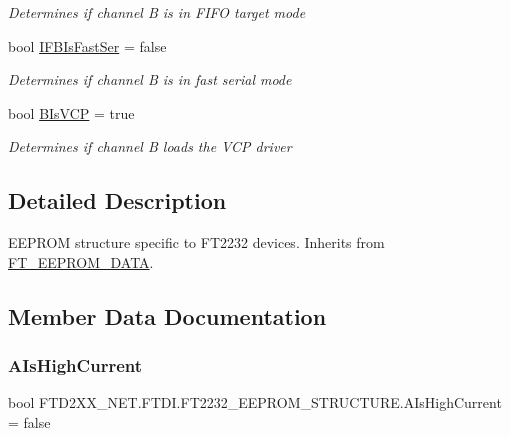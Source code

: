 \begin{DoxyCompactItemize}
\begin{DoxyCompactList}\small\item\em Determines if channel B is in F\+I\+FO target mode \end{DoxyCompactList}\item 
bool \mbox{\hyperlink{class_f_t_d2_x_x___n_e_t_1_1_f_t_d_i_1_1_f_t2232___e_e_p_r_o_m___s_t_r_u_c_t_u_r_e_a6bb7cdda276ae96eaab74710b90c5ad7}{I\+F\+B\+Is\+Fast\+Ser}} = false
\begin{DoxyCompactList}\small\item\em Determines if channel B is in fast serial mode \end{DoxyCompactList}\item 
bool \mbox{\hyperlink{class_f_t_d2_x_x___n_e_t_1_1_f_t_d_i_1_1_f_t2232___e_e_p_r_o_m___s_t_r_u_c_t_u_r_e_a4bab10e9f124f0db0df5128e3239ba21}{B\+Is\+V\+CP}} = true
\begin{DoxyCompactList}\small\item\em Determines if channel B loads the V\+CP driver \end{DoxyCompactList}\end{DoxyCompactItemize}


\subsection{Detailed Description}
E\+E\+P\+R\+OM structure specific to F\+T2232 devices. Inherits from \mbox{\hyperlink{class_f_t_d2_x_x___n_e_t_1_1_f_t_d_i_1_1_f_t___e_e_p_r_o_m___d_a_t_a}{F\+T\+\_\+\+E\+E\+P\+R\+O\+M\+\_\+\+D\+A\+TA}}. 



\subsection{Member Data Documentation}
\mbox{\label{class_f_t_d2_x_x___n_e_t_1_1_f_t_d_i_1_1_f_t2232___e_e_p_r_o_m___s_t_r_u_c_t_u_r_e_a1bd484ae83ec245cee79e90d8c5c27c5}} 
\subsubsection{\texorpdfstring{AIsHighCurrent}{AIsHighCurrent}}
{\footnotesize\ttfamily bool F\+T\+D2\+X\+X\+\_\+\+N\+E\+T.\+F\+T\+D\+I.\+F\+T2232\+\_\+\+E\+E\+P\+R\+O\+M\+\_\+\+S\+T\+R\+U\+C\+T\+U\+R\+E.\+A\+Is\+High\+Current = false}



